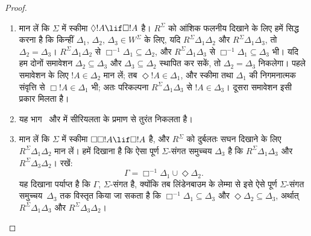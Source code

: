 \documentclass[../../../include/open-logic-section]{subfiles}
\begin{document}
\begin{proof}
  \begin{enumerate}
  \item मान लें कि $\Sigma$ में स्कीमा $\Diamond !A \lif \Box !A$ है।
    $R^\Sigma$ को आंशिक फलनीय दिखाने के लिए हमें सिद्ध करना है कि किन्हीं
    $\Delta_1$, $\Delta_2$, $\Delta_3 \in W^\Sigma$ के लिए, यदि
    $R^\Sigma \Delta_1\Delta_2$ और $R^\Sigma \Delta_1\Delta_3$, तो
    $\Delta_2=\Delta_3$। $R^\Sigma \Delta_1\Delta_2$ से
    $\Box^{-1}\Delta_1 \subseteq \Delta_2$, और $R^\Sigma
    \Delta_1\Delta_3$ से $\Box^{-1}\Delta_1 \subseteq
    \Delta_3$ भी। यदि हम दोनों समावेशन
    $\Delta_2 \subseteq \Delta_3$ और $\Delta_3 \subseteq \Delta_2$
    स्थापित कर सकें, तो $\Delta_2=\Delta_3$ निकलेगा। पहले समावेशन के लिए
    $!A \in \Delta_2$ मान लें; तब $\Diamond!A \in \Delta_1$, और स्कीमा
    तथा $\Delta_1$ की निगमनात्मक संवृत्ति से $\Box!A \in \Delta_1$ भी;
    अतः परिकल्पना $R^\Sigma \Delta_1\Delta_3$ से $!A \in \Delta_3$।
    दूसरा समावेशन इसी प्रकार मिलता है।

  \item यह भाग~ और
     में सीरियलता के प्रमाण से तुरंत निकलता
    है।

  \item मान लें कि $\Sigma$ में स्कीमा $\Box\Box!A \lif \Box!A$ है, और
    $R^\Sigma$ को दुर्बलतः सघन दिखाने के लिए $R^\Sigma
    \Delta_1\Delta_2$ मान लें। हमें दिखाना है कि ऐसा पूर्ण
    $\Sigma$-संगत समुच्चय $\Delta_3$ है कि $R^\Sigma
    \Delta_1\Delta_3$ और $R^\Sigma \Delta_3\Delta_2$। रखें:
    \[
    \Gamma = \Box^{-1}\Delta_1 \cup \Diamond\Delta_2.
    \]
    यह दिखाना पर्याप्त है कि $\Gamma$, $\Sigma$-संगत है, क्योंकि तब
    लिंडेनबाउम के लेम्मा से इसे ऐसे पूर्ण $\Sigma$-संगत
    समुच्चय~$\Delta_3$ तक विस्तृत किया जा सकता है कि
    $\Box^{-1}\Delta_1 \subseteq \Delta_3$ और $\Diamond\Delta_2
    \subseteq \Delta_3$, अर्थात् $R^\Sigma
    \Delta_1\Delta_3$ और $R^\Sigma
    \Delta_3\Delta_2$।


\end{enumerate}
\end{proof}
\end{document}
